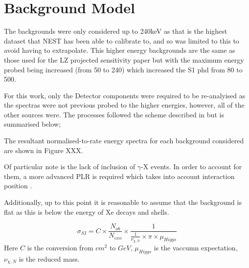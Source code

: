 \section{Background Model}
\par
The backgrounds were only considered up to 240keV as that is the highest dataset that NEST has been able to calibrate to, and so was limited to this to avoid having to extrapolate.
This higher energy backgrounds are the same as those used for the LZ projected sensitivity paper \cite{LZ_projected_sensitivity_paper_ref} but with the maximum energy probed being increased (from 50 to 240) which increased the S1 phd from 80 to 500.

\par
For this work, only the Detector components were required to be re-analyised as the spectras were not previous probed to the higher energies, however, all of the other sources were.
The processes followed the scheme described in \cite{LZ_projected_sensitivity_paper_ref} but is summarised below;



\par
The resultant normalised-to-rate energy spectra for each background considered are shown in Figure XXX.



\par
Of particular note is the lack of inclusion of $\gamma$-X events.
In order to account for them, a more advanced PLR is required which takes into account interaction position \cite{billyboxer_thesis_ref, LUX_RUN4_EFT_2021}.


\par
Additionally, up to this point it is reasonable to assume that the background is flat as this is below the energy of Xe decays and shells.



\begin{equation}
    \sigma_{SI} = C \times \frac{N_{ob}}{N_{exo}} \times \frac{1}{\frac{1}{\nu_{\chi,N}} \times \pi \times \mu_{Higgs}}
\end{equation}
Here $C$ is the conversion from $cm^{2}$ to $GeV$, $\mu_{Higgs}$ is the vaccumn expectation, $\nu_{\chi,N}$ is the reduced mass.

